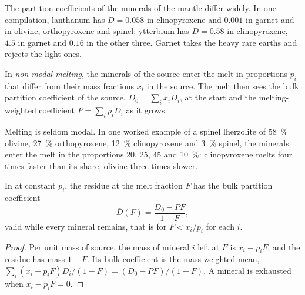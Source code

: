 The partition coefficients of the minerals of the mantle differ widely. In
one compilation, lanthanum has $D = 0.058$ in clinopyroxene and $0.001$ in
garnet and in olivine, orthopyroxene and spinel; ytterbium has $D = 0.58$ in
clinopyroxene, $4.5$ in garnet and $0.16$ in the other three. Garnet takes the
heavy rare earths and rejects the light ones.

\begin{definition}\label{def:b3:trace-element-modelling:nonmodal}
In \emph{non-modal melting}, the minerals of the
source enter the melt in proportions $p_i$ that differ from their mass
fractions $x_i$ in the source. The melt then sees the bulk partition
coefficient of the source, $D_0 = \sum_i x_iD_i$, at the start and the
melting-weighted coefficient $P = \sum_i p_iD_i$ as it grows.
\end{definition}

Melting is seldom modal. In one worked example of a spinel lherzolite of
\qty{58}{\percent} olivine, \qty{27}{\percent} orthopyroxene,
\qty{12}{\percent} clinopyroxene and \qty{3}{\percent} spinel, the minerals
enter the melt in the proportions 20, 25, 45 and \qty{10}{\percent}:
clinopyroxene melts four times faster than its share, olivine three times
slower.

\begin{proposition}
\label{prop:b3:trace-element-modelling:residue}
In  at constant $p_i$, the residue at the melt fraction $F$
has the bulk partition coefficient
\[
\bar D(F) = \frac{D_0 - PF}{1 - F},
\]
valid while every mineral remains, that is for $F < x_i/p_i$ for each $i$.
\end{proposition}

\begin{proof}
Per unit mass of source, the mass of mineral $i$ left at $F$ is $x_i - p_iF$,
and the residue has mass $1 - F$. Its bulk coefficient is the mass-weighted
mean, $\sum_i (x_i - p_iF)D_i/(1 - F) = (D_0 - PF)/(1 - F)$. A mineral is
exhausted when $x_i - p_iF = 0$.
\end{proof}

